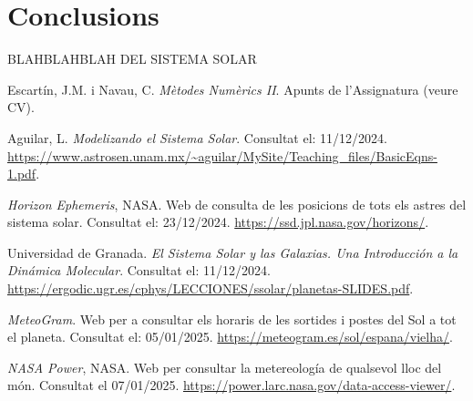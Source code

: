 \documentclass[10pt, twoside, a4paper]{article}
\begin{document}
\begin{table}[h!]
    \centering
    \caption{Taula comparativa de l'energia generada durant un any amb el model PVGIS i el nostre. }
    
\end{table}

\section{Conclusions}

BLAHBLAHBLAH DEL SISTEMA SOLAR

\newpage
\begin{thebibliography}{99}
    Escartín, J.M. i Navau, C. \textit{Mètodes Numèrics II}. Apunts de l'Assignatura (veure CV).

    Aguilar, L. \textit{Modelizando el Sistema Solar}. Consultat el: 11/12/2024. \url{https://www.astrosen.unam.mx/~aguilar/MySite/Teaching_files/BasicEqns-1.pdf}.

    \textit{Horizon Ephemeris}, NASA. Web de consulta de les posicions de tots els astres del sistema solar. Consultat el: 23/12/2024. \url{https://ssd.jpl.nasa.gov/horizons/}.

    Universidad de Granada. \textit{El Sistema Solar y las Galaxias. Una Introducción a la Dinámica Molecular}. Consultat el: 11/12/2024. \url{https://ergodic.ugr.es/cphys/LECCIONES/ssolar/planetas-SLIDES.pdf}.

    \textit{MeteoGram}. Web per a consultar els horaris de les sortides i postes del Sol a tot el planeta. Consultat el: 05/01/2025. \url{https://meteogram.es/sol/espana/vielha/}.

    \textit{NASA Power}, NASA. Web per consultar la metereología de qualsevol lloc del món. Consultat el 07/01/2025. \url{https://power.larc.nasa.gov/data-access-viewer/}.

    
\end{thebibliography}
\end{document}
